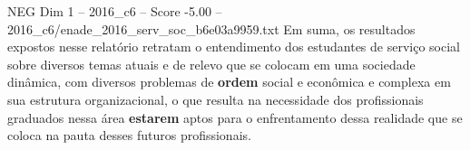 \begin{textsample}{NEG Dim 1 – 2016\_c6 – Score -5.00 – 2016\_c6/enade\_2016\_serv\_soc\_b6e03a9959.txt}
Em suma, os resultados expostos nesse relatório retratam o entendimento dos estudantes de serviço social sobre diversos temas atuais e de relevo que se colocam em uma sociedade dinâmica, com diversos problemas de \textbf{ordem} social e econômica e complexa em sua estrutura organizacional, o que resulta na necessidade dos profissionais graduados nessa área \textbf{estarem} aptos para o enfrentamento dessa realidade que se coloca na pauta desses futuros profissionais.

\end{textsample}

